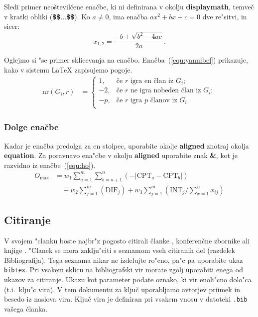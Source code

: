 \documentclass[sigconf,nonacm]{acmart}
\begin{document}
Sledi primer neoštevilčene enačbe, ki ni definirana v okolju
\textbf{displaymath}, temveč v kratki obliki (\textbf{\$\$$\ldots$\$\$}).  Ko $a
\ne 0$, ima enačba $ax^2 + bx + c = 0$ dve re"sitvi, in sicer:
%
$$x_{1, 2} = \frac{-b \pm \sqrt{b^2-4ac}}{2a}.$$

Oglejmo si "se primer sklicevanja na enačbo. Enačba~(\ref{equ:yannibel})
prikazuje, kako v sistemu \LaTeX{} zapisujemo pogoje.
%
\begin{equation}
    \begin{aligned} 
        \mathrm{nr}(G_i,r) & = \label{equ:yannibel}
        \begin{cases}
            1,  & \text{če $r$ igra en član iz $G_i$};\\
            -2, & \text{če $r$ ne igra nobeden član iz $G_i$}; \\
            -p, & \text{če $r$ igra $p$ članov iz $G_i$}.\\
        \end{cases}
    \end{aligned}
\end{equation}

\subsubsection{Dolge enačbe}

Kadar je enačba predolga za en stolpec, uporabite okolje \textbf{aligned}
znotraj okolja \textbf{equation}.  Za poravnavo ena"cbe v okolju
\textbf{aligned} uporabite znak \textbf{\&}, kot je razvidno iz
enačbe~(\ref{equ:ho}).
%
\begin{equation}
    \begin{aligned}
        O_{\max}& = w_1 \sum_{a=1}^{m} \sum_{b=a+1}^{n} (-\lvert\text{CPT}_a 
        -\text{CPT}_b\rvert)\\ 
        &\quad + w_2 \sum_{j=1}^{m} (\text{DIF}_j) + w_3 \sum_{j=1}^{m} 
        (\text{INT}_j/\sum_{x=1}^{n} x_{ij})
    \end{aligned}
    \label{equ:ho}
\end{equation}

\subsection{Citiranje}

V svojem "clanku boste najbr"z pogosto citirali članke \cite{lecun2015deep,
braams:babel, herlihy:methodology}, konferenčne zbornike
\cite{vrbancic2019transfer, clark:pct} ali knjige \cite{salas:calculus,
Lamport:LaTeX, fister2019computational}.  "Clanek se mora zaklju"citi s
seznamom vseh citiranih del (razdelek Bibliografija).  Tega seznama nikar ne
izdelujte ro"cno, pa"c pa uporabite ukaz \texttt{bibtex}.  Pri vsakem sklicu
na bibliografski vir morate zgolj uporabiti enega od ukazov za citiranje.
Ukazu kot parameter podate oznako, ki vir enoli"cno dolo"ca (t.i.\ klju"c
vira).  V tem dokumentu za ključ uporabljamo avtorjev priimek in besedo iz
naslova vira.  Ključ vira je definiran pri vsakem vnosu v datoteki
\texttt{.bib} vašega članka.
\end{document}
